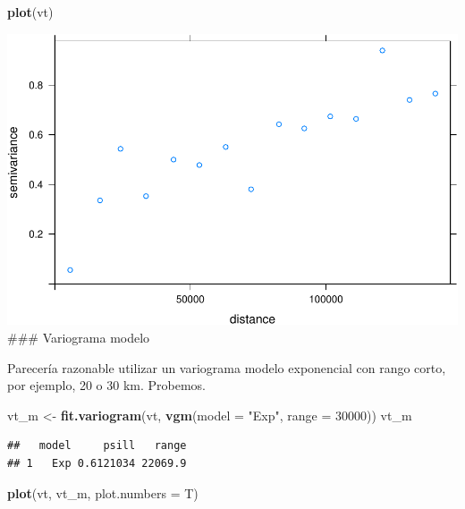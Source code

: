 \documentclass[11pt,]{article}
\newenvironment{Shaded}{\begin{snugshade}}{\end{snugshade}}
\newcommand{\KeywordTok}[1]{\textcolor[rgb]{0.13,0.29,0.53}{\textbf{#1}}}
\newcommand{\DataTypeTok}[1]{\textcolor[rgb]{0.13,0.29,0.53}{#1}}
\newcommand{\DecValTok}[1]{\textcolor[rgb]{0.00,0.00,0.81}{#1}}
\newcommand{\StringTok}[1]{\textcolor[rgb]{0.31,0.60,0.02}{#1}}
\newcommand{\NormalTok}[1]{#1}
\begin{document}
\begin{Shaded}
\begin{Highlighting}[]
\KeywordTok{plot}\NormalTok{(vt)}
\end{Highlighting}
\end{Shaded}

\includegraphics[width=800px]{proyecto_files/figure-latex/vgm-temp-1}
\#\#\# Variograma modelo

Parecería razonable utilizar un variograma modelo exponencial con rango
corto, por ejemplo, 20 o 30 km. Probemos.

\begin{Shaded}
\begin{Highlighting}[]
\NormalTok{vt_m <-}\StringTok{ }\KeywordTok{fit.variogram}\NormalTok{(vt, }\KeywordTok{vgm}\NormalTok{(}\DataTypeTok{model =} \StringTok{"Exp"}\NormalTok{, }\DataTypeTok{range =} \DecValTok{30000}\NormalTok{))}
\NormalTok{vt_m}
\end{Highlighting}
\end{Shaded}

\begin{verbatim}
##   model     psill   range
## 1   Exp 0.6121034 22069.9
\end{verbatim}

\begin{Shaded}
\begin{Highlighting}[]
\KeywordTok{plot}\NormalTok{(vt, vt_m, }\DataTypeTok{plot.numbers =}\NormalTok{ T)}
\end{Highlighting}
\end{Shaded}
\end{document}
